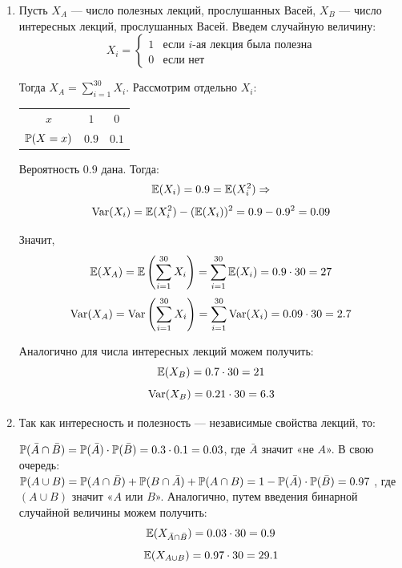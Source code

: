 \begin{enumerate}
\begin{enumerate}
\item Пусть $X_A$ — число полезных лекций, прослушанных Васей,  $X_B$ —
число интересных лекций, прослушанных Васей. Введем случайную величину:
\[X_i =
\begin{cases}
1 & \text{если } i\text{-ая лекция была полезна}\\
0 & \text{если нет}
\end{cases}
\]

Тогда $X_A = \sum\limits_{i=1}^{30}X_i$. Рассмотрим отдельно $X_i$:

\begin{center}
\begin{tabular}{@{}ccc@{}}
\toprule
$x$         & $1$             & $0$               \\
$\P(X=x)$ & $0.9$ & $0.1$ \\ \bottomrule
\end{tabular}
\end{center}

Вероятность $0.9$ дана. Тогда:
\[
\E(X_i) = 0.9 = \E(X^2_i) \Rightarrow
\]
\[
\Var(X_i) = \E(X^2_i) - (\E(X_i))^2 = 0.9 - 0.9^2 = 0.09
\]

Значит,
\[
\E(X_A) = \E\left(\sum\limits_{i=1}^{30}X_i\right) = \sum\limits_{i=1}^{30}\E(X_i)  =
0.9\cdot30 = 27
\]
\[
\Var(X_A) = \Var\left(\sum\limits_{i=1}^{30}X_i\right) = \sum\limits_{i=1}^{30}\Var(X_i) =
0.09\cdot30 = 2.7
\]

Аналогично для числа интересных лекций можем получить:
\[
\E(X_B) = 0.7\cdot 30 = 21
\]
\[
\Var(X_B) = 0.21\cdot 30 = 6.3
\]


\item Так как интересность и полезность — независимые свойства лекций, то:

$\P(\bar{A} \cap \bar{B}) = \P(\bar{A})\cdot \P(\bar{B}) = 0.3\cdot0.1 = 0.03$, где $\bar{A}$ значит «не $A$». В свою очередь:\\
 $\P(A\cup B) = \P(A\cap\bar{B}) + \P(B\cap\bar{A}) + \P(A\cap B) = 1 - \P(\bar{A})\cdot \P(\bar{B}) = 0.97$ , где $(A\cup B)$ значит «$A$  или $B$». Аналогично, путем введения бинарной случайной величины можем получить:
 \[
 \E(X_{\bar{A} \cap \bar{B}}) = 0.03 \cdot  30 = 0.9
 \]
 \[
 \E(X_{A\cup B}) = 0.97\cdot30 = 29.1
\]
\end{enumerate}


\end{enumerate}
